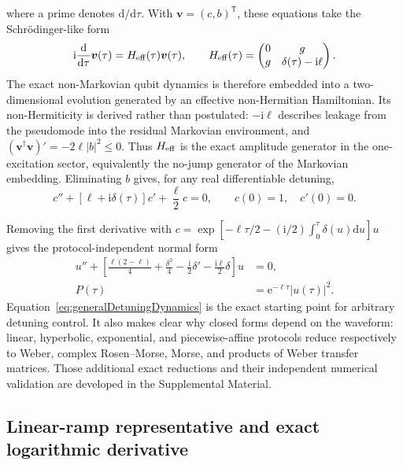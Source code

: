 \documentclass[reprint,superscriptaddress,floatfix,amsmath,amssymb,prresearch,aps]{revtex4-2}
\newcommand{\dd}{\mathrm{d}}
\newcommand{\ee}{\mathrm{e}}
\newcommand{\ii}{\mathrm{i}}
\begin{document}
where a prime denotes \(\dd/\dd\tau\). With
\(\bm v=(c,b)^{\mathsf T}\), these equations take the Schr\"odinger-like form
\begin{equation}
\ii\frac{\dd}{\dd\tau}\bm v(\tau)
=H_{\rm eff}(\tau)\bm v(\tau),
\qquad
H_{\rm eff}(\tau)=
\begin{pmatrix}
0 & g\\
g & \delta(\tau)-\ii\ell
\end{pmatrix}.
\label{eq:Heff}
\end{equation}
The exact non-Markovian qubit dynamics is therefore embedded into a
two-dimensional evolution generated by an effective non-Hermitian Hamiltonian.
Its non-Hermiticity is derived rather than postulated: \(-\ii\ell\) describes
leakage from the pseudomode into the residual Markovian environment, and
\((\bm v^\dagger\bm v)'=-2\ell|b|^2\leq0\). Thus
\(H_{\rm eff}\) is the exact amplitude generator in the one-excitation
sector, equivalently the no-jump generator of the Markovian embedding.
Eliminating \(b\) gives, for any real differentiable detuning,
\begin{equation}
c''+[\ell+\ii\delta(\tau)]c'+\frac{\ell}{2}c=0,
\qquad c(0)=1,\quad c'(0)=0.
\label{eq:exactODE}
\end{equation}

Removing the first derivative with
\(c=\exp[-\ell\tau/2-(\ii/2)\int_0^\tau\delta(u)\dd u]u\) gives the
protocol-independent normal form
\begin{equation}
\begin{aligned}
u''+\left[
\frac{\ell(2-\ell)}4+\frac{\delta^2}4
-\frac{\ii}{2}\delta'-\frac{\ii\ell}{2}\delta
\right]u&=0,\\
P(\tau)&=\ee^{-\ell\tau}|u(\tau)|^2.
\end{aligned}
\label{eq:generalDetuningDynamics}
\end{equation}
Equation~\eqref{eq:generalDetuningDynamics} is the exact starting point for
arbitrary detuning control. It also makes clear why closed forms depend on the
waveform: linear, hyperbolic, exponential, and piecewise-affine protocols
reduce respectively to Weber, complex Rosen--Morse, Morse, and products of
Weber transfer matrices. Those additional exact reductions and their
independent numerical validation are developed in the Supplemental Material.

\subsection{Linear-ramp representative and exact logarithmic derivative}
\end{document}
